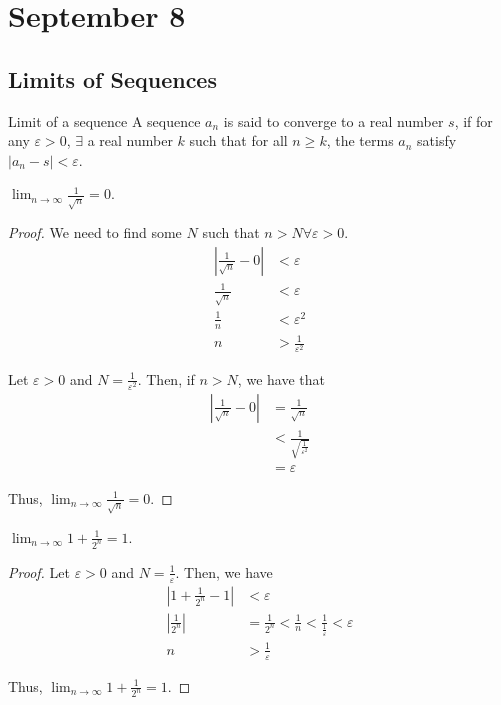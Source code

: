 \chapter{September 8}

\section{Limits of Sequences}
\begin{definition}{Limit of a sequence}{}
    A sequence $a_n$ is said to converge to a real number $s$, if for any $\varepsilon > 0$, $\exists$ a real number $k$ such that for all $n \geq k$, the terms $a_n$ satisfy $|a_n - s| < \varepsilon$.
\end{definition}

\begin{theorem}{}{}
    $\lim_{n \to \infty} \frac{1}{\sqrt{n}} = 0$.
\end{theorem}
\begin{proof}
    We need to find some $N$ such that $n > N \forall \varepsilon > 0$.
    \begin{align*}
        | \frac{1}{\sqrt{n}} - 0 | &< \varepsilon \\
        \frac{1}{\sqrt{n}} &< \varepsilon \\
        \frac{1}{n} &< \varepsilon^2 \\
        n &> \frac{1}{\varepsilon^2}
    \end{align*}
    
    Let $\varepsilon > 0$ and $N = \frac{1}{\varepsilon^2}$. Then, if $n > N$, we have that
    \begin{align*}
        | \frac{1}{\sqrt{n}} - 0 | &= \frac{1}{\sqrt{n}} \\
        &< \frac{1}{\sqrt{\frac{1}{\varepsilon^2}}} \\
        &= \varepsilon
    \end{align*}

    Thus, $\lim_{n \to \infty} \frac{1}{\sqrt{n}} = 0$.
\end{proof}

\begin{theorem}{}{}
    $\lim_{n \to \infty} 1 + \frac{1}{2^n} = 1$.
\end{theorem}
\begin{proof}
    Let $\varepsilon > 0$ and $N = \frac{1}{\varepsilon}$. Then, we have
    \begin{align*}
        | 1 + \frac{1}{2^n} - 1 | &< \varepsilon \\
        | \frac{1}{2^n} | &= \frac{1}{2^n} < \frac{1}{n} < \frac{1}{\frac{1}{\varepsilon}} < \varepsilon \\
        n &> \frac{1}{\varepsilon}
    \end{align*}

    Thus, $\lim_{n \to \infty} 1 + \frac{1}{2^n} = 1$.
\end{proof}


